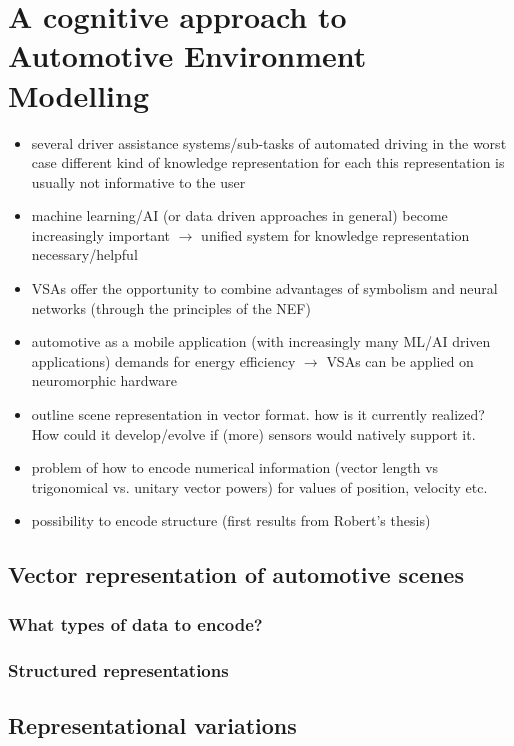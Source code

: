 \chapter{A cognitive approach to Automotive Environment Modelling}

\begin{itemize}
	\item several driver assistance systems/sub-tasks of automated driving
	\subitem in the worst case different kind of knowledge representation for each
	\subitem this representation is usually not informative to the user
	
	\item machine learning/\ac{AI} (or data driven approaches in general) become increasingly important $\rightarrow$ unified system for knowledge representation necessary/helpful
	\item \aclp{VSA} offer the opportunity to combine advantages of symbolism and neural networks (through the principles of the \acf{NEF}) 
	\item automotive as a mobile application (with increasingly many ML/AI driven applications) demands for energy efficiency $\rightarrow$ \acp{VSA} can be applied on neuromorphic hardware
	\item outline scene representation in vector format. how is it currently realized? How could it develop/evolve if (more) sensors would natively support it.
	\item problem of how to encode numerical information (vector length vs trigonomical vs. unitary vector powers) for values of position, velocity etc. 
	\item possibility to encode structure (first results from Robert's thesis)
\end{itemize}

\section{Vector representation of automotive scenes}
\subsection{What types of data to encode?}
\subsection{Structured representations}

\section{Representational variations}
